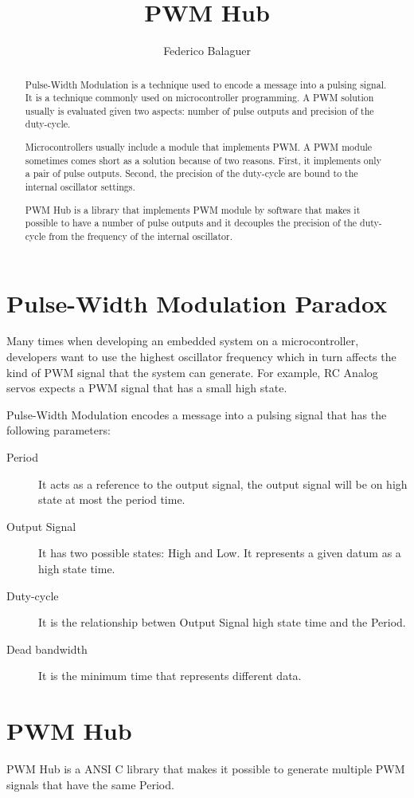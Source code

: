 \documentclass[a4paper,10pt] {article} %
\title{PWM Hub}
\author{Federico Balaguer}
\begin{document}
\maketitle

\begin{abstract}
Pulse-Width Modulation is a technique used to encode a message into a pulsing signal. It is a technique commonly used on microcontroller programming. A PWM solution usually is evaluated given two aspects: number of pulse outputs and precision of the duty-cycle. 

Microcontrollers usually include a module that implements PWM. A PWM module sometimes comes short as a solution because of two reasons. First, it implements only a pair of pulse outputs. Second, the precision of the duty-cycle are bound to the internal oscillator settings.

PWM Hub is a library that implements PWM module by software that makes it possible to have a number of pulse outputs and it decouples the precision of the duty-cycle from the frequency of the internal oscillator.
\end{abstract}

\section{Pulse-Width Modulation Paradox}
Many times when developing an embedded system on a microcontroller, developers 
want to use the highest oscillator frequency which in turn affects the kind of 
PWM signal that the system can generate. For example, RC Analog servos expects 
a PWM signal that has a small high state.   

Pulse-Width Modulation encodes a message into a pulsing signal that has 
the following parameters:
\begin{description}
  \item[Period] It acts as a reference to the output signal, the output signal will be on high state at most the period time.     
  \item[Output Signal] It has two possible states: High and Low. It represents a given datum as a high state time. 
  \item[Duty-cycle] It is the relationship betwen Output Signal high state time and the Period.
  \item[Dead bandwidth] It is the minimum time that represents different data.
\end{description}


\section{PWM Hub}
PWM Hub is a ANSI C library that makes it possible to generate multiple PWM 
signals that have the same Period.
\end{document}
